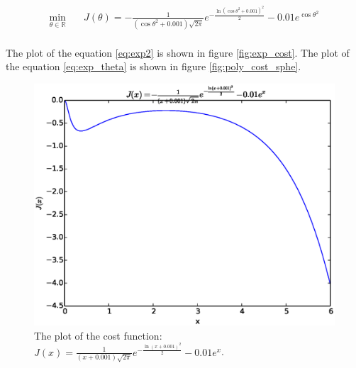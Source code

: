 \documentclass[a4paper,12pt]{article}
\begin{document}
\begin{equation}\label{eq:exp_theta}
\begin{aligned}
\min_{\theta\in \mathbb{R}} \quad &J(\theta)=-\frac{1}{(\cos \theta ^2+0.001) \sqrt{2 \pi}}e^{-\frac{\ln(\cos \theta ^2+0.001)^2}{2} }-0.01 e^{\cos \theta ^2}\\
\end{aligned}
\end{equation}

The plot of the equation \ref{eq:exp2} is shown in figure \ref{fig:exp_cost}.  The plot of the equation \ref{eq:exp_theta} is shown in figure \ref{fig:poly_cost_sphe}.\\  


\begin{figure}[H]
\begin{center}
\includegraphics[width=1.0\linewidth]{exponential.eps}


\end{center}
   \caption{The plot of the cost function: $J(x) =\frac{1}{(x+0.001) \sqrt{2 \pi}}e^{-\frac{\ln(x+0.001)^2}{2} }-0.01 e^x$. }
\label{fig:exp_cost_sphe}
\end{figure}
\end{document}
